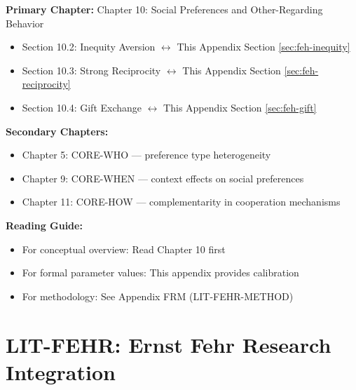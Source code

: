 \begin{tcolorbox}[colback=purple!5!white, colframe=purple!75!black,
    title=Chapter Linkage]

\textbf{Primary Chapter:} Chapter 10: Social Preferences and Other-Regarding Behavior
\begin{itemize}[nosep]
\item Section 10.2: Inequity Aversion $\leftrightarrow$ This Appendix Section \ref{sec:feh-inequity}
\item Section 10.3: Strong Reciprocity $\leftrightarrow$ This Appendix Section \ref{sec:feh-reciprocity}
\item Section 10.4: Gift Exchange $\leftrightarrow$ This Appendix Section \ref{sec:feh-gift}
\end{itemize}

\textbf{Secondary Chapters:}
\begin{itemize}[nosep]
\item Chapter 5: CORE-WHO --- preference type heterogeneity
\item Chapter 9: CORE-WHEN --- context effects on social preferences
\item Chapter 11: CORE-HOW --- complementarity in cooperation mechanisms
\end{itemize}

\textbf{Reading Guide:}
\begin{itemize}[nosep]
\item For conceptual overview: Read Chapter 10 first
\item For formal parameter values: This appendix provides calibration
\item For methodology: See Appendix FRM (LIT-FEHR-METHOD)
\end{itemize}

\end{tcolorbox}


\chapter{LIT-FEHR: Ernst Fehr Research Integration}
\label{app:feh}


